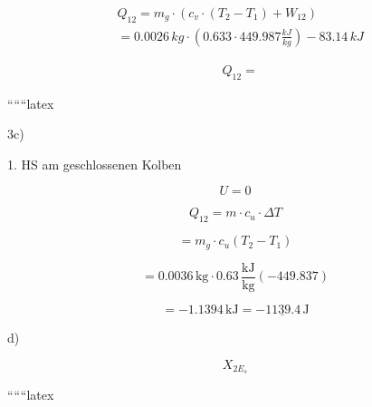 \begin{align*}
&Q_{12} = m_g \cdot (c_v \cdot (T_2 - T_1) + W_{12}) \\
&= 0.0026 \, kg \cdot (0.633 \cdot 449.987 \frac{kJ}{kg}) - 83.14 \, kJ
\end{align*}

\begin{align*}
&Q_{12} = 
\end{align*}

``````latex

3c)

1. HS am geschlossenen Kolben

\[
U = 0
\]

\[
Q_{12} = m \cdot c_{u} \cdot \Delta T
\]

\[
= m_{g} \cdot c_{u} (T_{2} - T_{1})
\]

\[
= 0.0036 \, \text{kg} \cdot 0.63 \, \frac{\text{kJ}}{\text{kg}} (-449.837)
\]

\[
= -1.1394 \, \text{kJ} = \underline{-1139.4 \, \text{J}}
\]

d)

\[
X_{2E_{s}}
\]

``````latex


